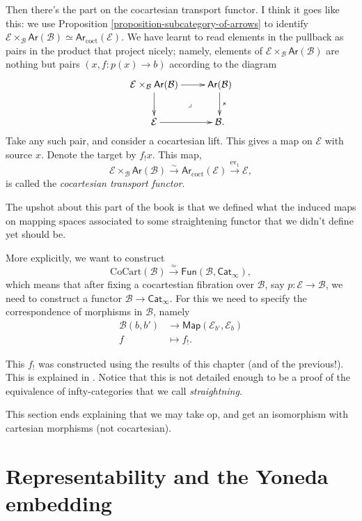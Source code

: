 \noindent
Then there's the part on the cocartesian
transport functor.
I think it goes like this: we use Proposition
\ref{proposition-subcategory-of-arrows} to
identify
$\mathcal{E}\times_{\mathcal{B}}\mathsf{Ar}
(\mathcal{B})
\simeq
\mathsf{Ar}_{\text{coct}}(\mathcal{E})$.
We have learnt to read elements in the
pullback
as pairs in the product that project nicely;
namely,
elements of
$\mathcal{E}\times_{\mathcal{B}}\mathsf{Ar}
(\mathcal{B})$
are nothing but pairs $(x,f:p(x)\to b)$
according to the diagram
$$
\xymatrix{
\mathcal{E}\times_{\mathcal{B}}\mathsf{Ar}
(\mathcal{B})
\ar[r]\ar[d]\ar@{}[dr]|-{\lrcorner}&
\mathsf{Ar}(\mathcal{B})\ar[d]^{s}\\
\mathcal{E}\ar[r]&\mathcal{B}.
}
$$
Take any such pair, and consider a
cocartesian lift.
This gives a map on $\mathcal{E}$ with source
$x$.
Denote the target by $f_!x$.
This map,
$$
\mathcal{E}\times_{\mathcal{B}}\mathsf{Ar}
(\mathcal{B})
\xrightarrow{\sim}\mathsf{Ar}_{\text{coct}}
(\mathcal{E})
\xrightarrow{\text{ev}_1}\mathcal{E},
$$
is called the {\it cocartesian transport
functor}.

\medskip\noindent
The upshot about this part of the book
is that we defined what the induced maps on
mapping spaces
associated to some straightening functor
that we didn't define yet should be.

More explicitly, we want to construct
$$
\text{CoCart}(\mathcal{B})
\xrightarrow{\simeq}
\mathsf{Fun}(\mathcal{B},\mathsf{Cat}
_{\infty}),
$$
which means that after fixing a cocartestian
fibration
over $\mathcal{B}$, say
$p:\mathcal{E} \to \mathcal{B}$,
we need to construct a functor $\mathcal{B}
\to \mathsf{Cat}_{\infty}$.
For this we need to specify
the correspondence of morphisms in
$\mathcal{B}$,
namely
$$
\begin{aligned}
\mathcal{B}(b,b') &\longrightarrow
\mathsf{Map}(\mathcal{E}_{b'}, \mathcal{E}_b)
\\
f &\longmapsto f_!.
\end{aligned}
$$

\noindent
This $f_!$ was constructed using the results
of this chapter
(and of the previous!).
This is explained in \cite[Section
3.7]{rune}.
Notice that this is not detailed
enough to be a proof of the equivalence
of infty-categories that we call {\it
straightning}.

This section ends explaining that we may take
op,
and get an isomorphism with cartesian
morphisms
(not cocartesian).

\section{Representability and the Yoneda
embedding}
\label{section-representability}

